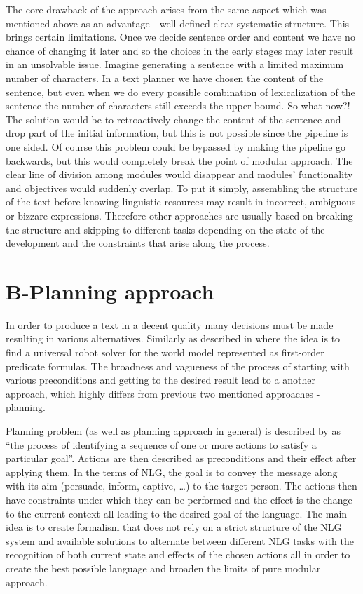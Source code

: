 The core drawback of the approach arises from the same aspect which was mentioned above as an advantage - well defined clear systematic structure. This brings certain limitations. Once we decide sentence order and content we have no chance of changing it later and so the choices in the early stages may later result in an unsolvable issue. Imagine generating a sentence with a limited maximum number of characters. In a text planner we have chosen the content of the sentence, but even when we do every possible combination of lexicalization of the sentence the number of characters still exceeds the upper bound. So what now?! The solution would be to retroactively change the content of the sentence and drop part of the initial information, but this is not possible since the pipeline is one sided. Of course this problem could be bypassed by making the pipeline go backwards, but this would completely break the point of modular approach. The clear line of division among modules would disappear and modules' functionality and objectives would suddenly overlap. To put it simply, assembling the structure of the text before knowing linguistic resources may result in incorrect, ambiguous or bizzare expressions. Therefore other approaches are usually based on breaking the structure and skipping to different tasks depending on the state of the development and the constraints that arise along the process.


\section{B-Planning approach}
In order to produce a text in a decent quality many decisions must be made resulting in various alternatives. Similarly as described in \cite{fikes1971strips} where the idea is to find a universal robot solver for the world model represented as first-order predicate formulas. The broadness and vagueness of the process of starting with various preconditions and getting to the desired result lead to a another approach, which highly differs from previous two mentioned approaches - planning.

Planning problem (as well as planning approach in general) is described by \cite{gatt2018survey} as “the process of identifying a sequence of one or more actions to satisfy a particular goal”. Actions are then described as preconditions and their effect after applying them. In the terms of NLG, the goal is to convey the message along with its aim (persuade, inform, captive, …) to the target person. The actions then have constraints under which they can be performed and the effect is the change to the current context all leading to the desired goal of the language. The main idea is to create formalism that does not rely on a strict structure of the NLG system and available solutions to alternate between different NLG tasks with the recognition of both current state and effects of the chosen actions all in order to create the best possible language and broaden the limits of pure modular approach. 

